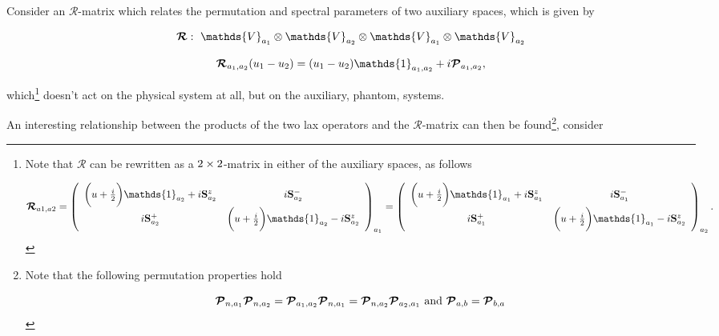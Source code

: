 \documentclass{homework}
\begin{document}
\begin{df}
Consider an $\bm{\mathcal{R}}$-matrix which relates the permutation and spectral parameters of two auxiliary spaces, which is given by  

\begin{equation}
\begin{array}{c}
     \bm{\mathcal{R}}: \blanky \mathds{V}_{a_1} \otimes \mathds{V}_{a_2} \otimes \mathds{V}_{a_1} \otimes \mathds{V}_{a_2} \\ 
     \\
     \bm{\mathcal{R}}_{a_1, a_2}(u_1-u_2) = (u_1-u_2) \mathds{1}_{a_1, a_2} + i \bm{\mathcal{P}}_{a_1, a_2}, \\
     \label{R-matrix def}
\end{array}
\end{equation}
 
which\footnote{Note that $\bm{\mathcal{R}}$ can be rewritten as a $2 \times 2$-matrix in either of the auxiliary spaces, as follows

\begin{equation}
    \bm{\mathcal{R}}_{a1, a2} = \left(\begin{array}{cc}
        \bigg(u + \frac{i}{2}\bigg) \mathds{1}_{a_2} + i \spin_{a_2}^z & i \spin_{a_2}^{-} \\
        i \spin_{a_2}^{+}  & \bigg(u + \frac{i}{2}\bigg) \mathds{1}_{a_2} - i \spin_{a_2}^z 
    \end{array} \right)_{a_1} = \left(\begin{array}{cc}
        \bigg(u + \frac{i}{2}\bigg) \mathds{1}_{a_1} + i \spin_{a_1}^z & i \spin_{a_1}^{-} \\
        i \spin_{a_1}^{+}  & \bigg(u + \frac{i}{2}\bigg) \mathds{1}_{a_1} - i \spin_{a_2}^z 
    \end{array} \right)_{a_2}.
\end{equation}} doesn't act on the physical system at all, but on the auxiliary, phantom, systems.
\end{df}


An interesting relationship between the products of the two lax operators and the $\bm{\mathcal{R}}$-matrix can then be found\footnote{Note that the following permutation properties hold 

\begin{equation}
\bm{\mathcal{P}}_{n, a_1}\bm{\mathcal{P}}_{n, a_2} = \bm{\mathcal{P}}_{a_1, a_2}\bm{\mathcal{P}}_{n, a_1} = \bm{\mathcal{P}}_{n, a_2}\bm{\mathcal{P}}_{a_2, a_1} \textnormal{ and } \bm{\mathcal{P}}_{a, b} = \bm{\mathcal{P}}_{b, a}
\end{equation}

}, consider 
\end{document}
